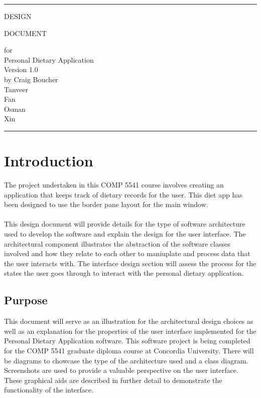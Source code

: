 \documentclass{scrreprt}
\date{}
\def\myversion{1.0}
\begin{document}
\begin{titlepage}
  \flushright\bfseries\huge
    \rule{\linewidth}{5pt}
    \par
    \vspace{1cm}
    {\Huge DESIGN \par DOCUMENT \par}
    \vspace{2cm}
    for \\
    \vspace{2cm}
    Personal Dietary Application \\
    \vspace{2cm}
     \LARGE{Version \myversion \\}
    \vspace{2cm}
    by Craig Boucher \\
    Tanveer \\
    Fan \\
    Osman \\
    Xin
    \vspace{2cm}
    \rule{\linewidth}{5pt}
\end{titlepage}
\tableofcontents
\chapter{Introduction}
The project undertaken in this COMP 5541 course involves creating an application that keeps track of dietary records for the user. This diet app has been designed to use the border pane layout for the main window. \\ \\ 
This design document will provide details for the type of software architecture used to develop the software and explain the design for the user interface. The architectural component illustrates the abstraction of the software classes involved and how they relate to each other to maniuplate and process data that the user interacts with. The interface design section will assess the process for the states the user goes through to interact with the personal dietary application.
\section{Purpose}
This document will serve as an illustration for the architectural design choices as well as an explanation for the properties of the user interface implemented for the Personal Dietary Application software. This software project is being completed for the COMP 5541 graduate diploma course at Concordia University. There will be diagrams to chowcase the type of the architecture used and a class diagram. Screenshots are used to provide a valuable perspective on the user interface. These graphical aids are described in further detail to demonstrate the functionality of the interface.
\end{document}
